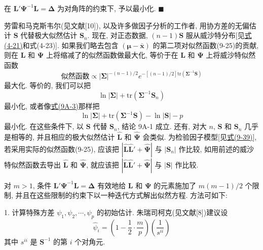 
在 $\mathbf{L}'\boldsymbol{\Psi}^{-1}\mathbf{L}=\boldsymbol{\Delta}$ 为对角阵的约束下, 予以最小化. \hfill$\blacksquare$

\noindent{}\quad 劳雷和马克斯韦尔(见文献[10]), 以及许多做因子分析的工作者, 用协方差的无偏估计 $\mathbf{S}$ 代替极大似然估计 $\mathbf{S}_n$. 现在, 对正态数据, $(n-1)\mathbf{S}$ 服从威沙特分布[见\hyperref[eq:4-21]{式(4-21)}和式(4-23)]. 如果我们略去包含 $(\boldsymbol{\mu}-\bar{\mathbf{x}})$ 的第二项对似然函数(9-25)的贡献, 则在 $\mathbf{L}$ 和 $\boldsymbol{\Psi}$ 上将缩减了的似然函数做最大化, 等价于在 $\mathbf{L}$ 和 $\boldsymbol{\Psi}$ 上将威沙特似然函数
\[
\text{似然函数}\propto|\boldsymbol{\Sigma}|^{-(n-1)/2}e^{-[(n-1)/2]\mathrm{tr}(\boldsymbol{\Sigma}^{-1}\mathbf{S})}
\]
最大化. 等价的, 我们可以把
\[
\ln|\boldsymbol{\Sigma}|+\mathrm{tr}(\boldsymbol{\Sigma}^{-1}\mathbf{S}_n)
\]
最小化, 或者像\hyperref[eq:9A-3]{式(9A-3)}那样把
\[
\ln|\boldsymbol{\Sigma}|+\mathrm{tr}(\boldsymbol{\Sigma}^{-1}\mathbf{S})-\ln|\mathbf{S}|-p
\]
最小化. 在这些条件下, 以 $\mathbf{S}$ 代替 $\mathbf{S}_n$, 结论 9A-1 成立. 还有, 对大 $n$, $\mathbf{S}$ 和 $\mathbf{S}_n$ 几乎是相等的, 并且相应的极大似然估计 $\hat{\mathbf{L}}$ 和 $\hat{\boldsymbol{\Psi}}$ 会类似. 为检验因子模型[见\hyperref[eq:9-39]{式(9-39)}], 若采用实际的似然函数(9-25), 应该把 $|\hat{\mathbf{L}}\hat{\mathbf{L}}'+\hat{\boldsymbol{\Psi}}|$ 与 $|\mathbf{S}_n|$ 作比较, 如用前述的威沙特似然函数去导出 $\hat{\mathbf{L}}$ 和 $\hat{\boldsymbol{\Psi}}$, 就应该把 $|\hat{\mathbf{L}}\hat{\mathbf{L}}'+\hat{\boldsymbol{\Psi}}|$ 与 $|\mathbf{S}|$ 作比较.


对 $m>1$, 条件 $\mathbf{L}'\boldsymbol{\Psi}^{-1}\mathbf{L}=\boldsymbol{\Delta}$ 有效地给 $\mathbf{L}$ 和 $\boldsymbol{\Psi}$ 的元素施加了 $m(m-1)/2$ 个限制, 并且在这些限制的约束下以一种迭代方式解出似然方程. 方法可如下:

1. 计算特殊方差 $\psi_1,\psi_2,\cdots,\psi_p$ 的初始估计. 朱瑞司柯克(见文献[8])建议设
\label{eq:9A-4}
\begin{equation}
\hat{\psi}_i=\left(1-\frac{1}{2}\cdot\frac{m}{p}\right)\left(\frac{1}{s^{ii}}\right) \tag{9A-4}
\end{equation}
其中 $s^{ii}$ 是 $\mathbf{S}^{-1}$ 的第 $i$ 个对角元.


